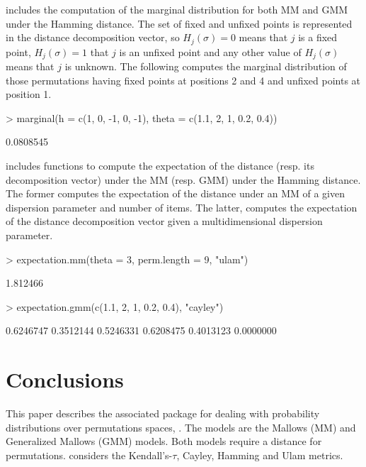 \documentclass[article,nojss]{jss}
\begin{document}
 includes the computation of the marginal distribution for both MM and GMM under the Hamming distance. The set of fixed and unfixed points is represented in the distance decomposition vector, so $H_j(\sigma)=0$ means that $j$ is a fixed point,  $H_j(\sigma)=1$ that $j$ is an unfixed point and any other value of $H_j(\sigma)$ means that $j$ is unknown. The following computes the marginal distribution of those permutations having fixed points at positions 2 and 4 and unfixed points at position 1. 

\begin{Schunk}
\begin{Sinput}
> marginal(h = c(1, 0, -1, 0, -1), theta = c(1.1, 2, 1, 0.2, 0.4))
\end{Sinput}
\begin{Soutput}
[1] 0.0808545
\end{Soutput}
\end{Schunk}

 includes functions to compute the expectation of the distance (resp. its decomposition vector) under the MM (resp.  GMM) under the Hamming distance. The former computes the expectation of the distance under an MM of a given dispersion parameter and number of items. The latter, computes the expectation of the distance decomposition vector given a multidimensional dispersion parameter. 
\begin{Schunk}
\begin{Sinput}
> expectation.mm(theta = 3, perm.length = 9, "ulam")
\end{Sinput}
\begin{Soutput}
[1] 1.812466
\end{Soutput}
\begin{Sinput}
> expectation.gmm(c(1.1, 2, 1, 0.2, 0.4), "cayley")
\end{Sinput}
\begin{Soutput}
[1] 0.6246747 0.3512144 0.5246331 0.6208475 0.4013123 0.0000000
\end{Soutput}
\end{Schunk}
 

\section{Conclusions}
\label{sec:conclusion}
This paper describes the associated  package for dealing with probability distributions over permutations spaces, . The models are the Mallows (MM) and Generalized Mallows (GMM) models. Both models require a distance for permutations.  considers the Kendall's-$\tau$, Cayley, Hamming and Ulam metrics. 
\end{document}
